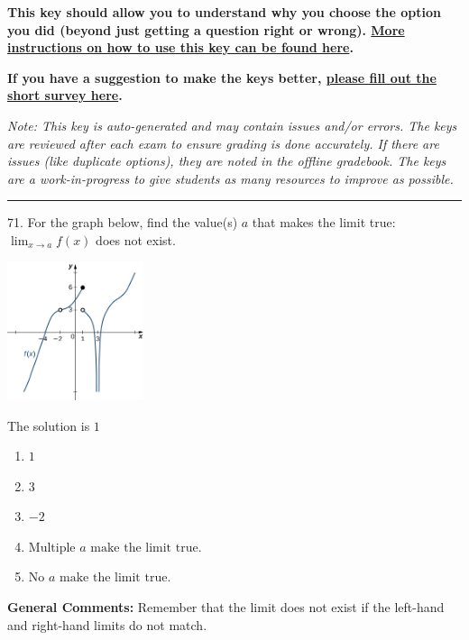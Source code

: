\documentclass{extbook}[14pt]
\begin{document}
\textbf{This key should allow you to understand why you choose the option you did (beyond just getting a question right or wrong). \href{https://xronos.clas.ufl.edu/mac1105spring2020/courseDescriptionAndMisc/Exams/LearningFromResults}{More instructions on how to use this key can be found here}.}

\textbf{If you have a suggestion to make the keys better, \href{https://forms.gle/CZkbZmPbC9XALEE88}{please fill out the short survey here}.}

\textit{Note: This key is auto-generated and may contain issues and/or errors. The keys are reviewed after each exam to ensure grading is done accurately. If there are issues (like duplicate options), they are noted in the offline gradebook. The keys are a work-in-progress to give students as many resources to improve as possible.}

\rule{\textwidth}{0.4pt}

71. For the graph below, find the value(s) $a$ that makes the limit true: $ \displaystyle \lim_{x \rightarrow a} f(x)$ does not exist.
\begin{center} \includegraphics[width=0.3\textwidth]{../Figures/evaluateLimitGraphicallyA.png} \end{center} 

The solution is $ 1 $ 

\begin{enumerate}[label=\Alph*.] 
\item $ 1 $ 

  
\item $ 3 $ 

  
\item $ -2 $ 

  
\item $ \text{Multiple } a \text{ make the limit true}. $ 

  
\item $ \text{No } a \text{ make the limit true}. $ 

  
\end{enumerate} 
 
\textbf{General Comments:} Remember that the limit does not exist if the left-hand and right-hand limits do not match.
\end{document}
